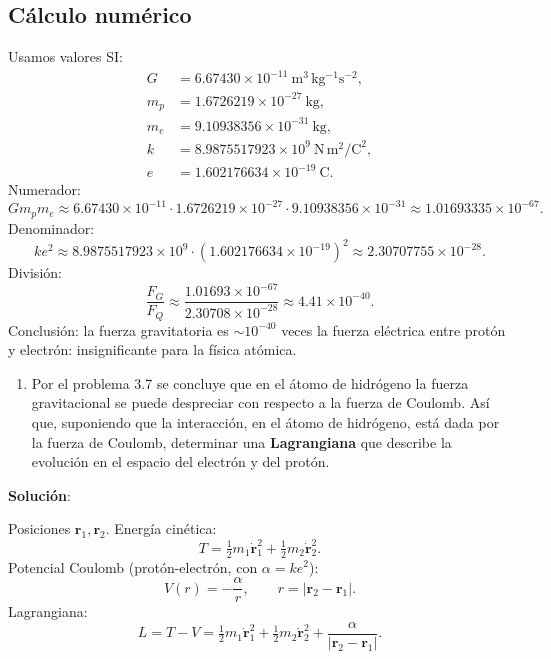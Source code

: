 \documentclass{article}
\newenvironment{AGbox}[1][7]%
{%
  \begin{tcolorbox}[
    enhanced, breakable,
    colframe=AppleGreen,
    colback=AppleGreen!#1,
    boxrule=1pt,
    borderline west={2mm}{-10mm}{AppleGreen},
    sharp corners=southwest,
    left=14pt,right=14pt,top=10pt,bottom=10pt,
     boxsep=6pt,
  ]%
}{%
  \end{tcolorbox}%
}
\begin{document}
\subsection*{Cálculo numérico}
Usamos valores SI:
\[
\begin{aligned}
G &= 6.67430\times10^{-11}\ \mathrm{m^3\,kg^{-1}s^{-2}},\\
m_p &= 1.6726219\times10^{-27}\ \mathrm{kg},\\
m_e &= 9.10938356\times10^{-31}\ \mathrm{kg},\\
k &= 8.9875517923\times10^9\ \mathrm{N\,m^2/C^2},\\
e &= 1.602176634\times10^{-19}\ \mathrm{C}.
\end{aligned}
\]
Numerador:
\[
G m_p m_e \approx 6.67430\times10^{-11}\cdot 1.6726219\times10^{-27}\cdot 9.10938356\times10^{-31}
\approx 1.01693335\times10^{-67}.
\]
Denominador:
\[
k e^2 \approx 8.9875517923\times10^9\cdot(1.602176634\times10^{-19})^2
\approx 2.30707755\times10^{-28}.
\]
División:
\[
\frac{F_G}{F_Q} \approx \frac{1.01693\times10^{-67}}{2.30708\times10^{-28}}
\approx 4.41\times10^{-40}.
\]
Conclusión: la fuerza gravitatoria es \(\sim 10^{-40}\) veces la fuerza eléctrica entre protón y electrón: insignificante para la física atómica.


\begin{AGbox}[8]
\begin{enumerate}[label={{\textcolor{trueblue}{\textbf{Pr.} \arabic*.8}}}, start=3]
  \item Por el problema 3.7 se concluye que en el átomo de hidrógeno la fuerza gravitacional se puede despreciar con respecto a la fuerza de Coulomb. Así que, suponiendo que la interacción, en el átomo de hidrógeno, está dada por la fuerza de Coulomb, determinar una \textbf{Lagrangiana} que describe la evolución en el espacio del electrón y del protón.
\end{enumerate}
\end{AGbox}

\textcolor{Cinnabar}{\textbf{Solución}}:

Posiciones \(\boldsymbol r_1,\boldsymbol r_2\). Energía cinética:
\[
T = \tfrac12 m_1\dot{\boldsymbol r}_1^2 + \tfrac12 m_2\dot{\boldsymbol r}_2^2.
\]
Potencial Coulomb (protón-electrón, con \(\alpha=k e^2\)):
\[
V(r) = -\frac{\alpha}{r},\qquad r=|\boldsymbol r_2-\boldsymbol r_1|.
\]
Lagrangiana:
\[
\boxed{L = T - V = \tfrac12 m_1\dot{\boldsymbol r}_1^2 + \tfrac12 m_2\dot{\boldsymbol r}_2^2 + \frac{\alpha}{|\boldsymbol r_2-\boldsymbol r_1|}.}
\]
\end{document}
